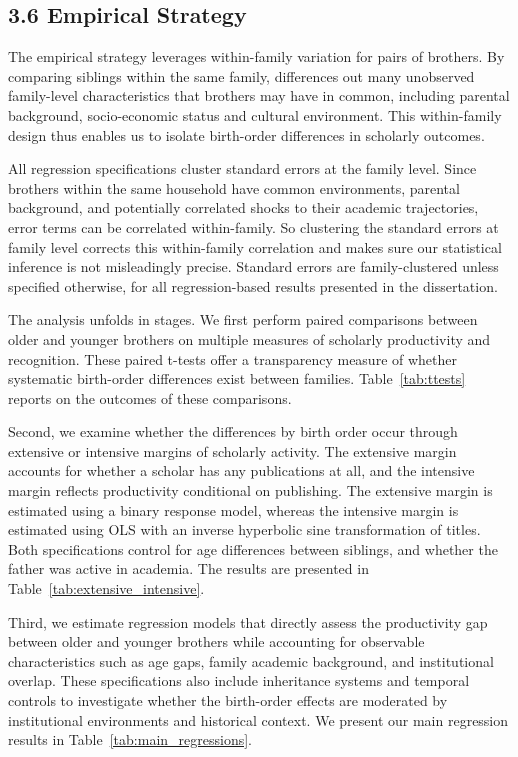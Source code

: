 \subsection*{3.6 Empirical Strategy}

The empirical strategy leverages within-family variation for pairs of brothers. By comparing siblings within the same family, differences out many unobserved family-level characteristics that brothers may have in common, including parental background, socio-economic status and cultural environment. This within-family design thus enables us to isolate birth-order differences in scholarly outcomes.

All regression specifications cluster standard errors at the family level. Since brothers within the same household have common environments, parental background, and potentially correlated shocks to their academic trajectories, error terms can be correlated within-family. So clustering the standard errors at family level corrects this within-family correlation and makes sure our statistical inference is not misleadingly precise. Standard errors are family-clustered unless specified otherwise, for all regression-based results presented in the dissertation.

The analysis unfolds in stages. We first perform paired comparisons between older and younger brothers on multiple measures of scholarly productivity and recognition. These paired t-tests offer a transparency measure of whether systematic birth-order differences exist between families. Table~\ref{tab:ttests} reports on the outcomes of these comparisons.

Second, we examine whether the differences by birth order occur through extensive or intensive margins of scholarly activity. The extensive margin accounts for whether a scholar has any publications at all, and the intensive margin reflects productivity conditional on publishing. The extensive margin is estimated using a binary response model, whereas the intensive margin is estimated using OLS with an inverse hyperbolic sine transformation of titles. Both specifications control for age differences between siblings, and whether the father was active in academia. The results are presented in Table~\ref{tab:extensive_intensive}.

Third, we estimate regression models that directly assess the productivity gap between older and younger brothers while accounting for observable characteristics such as age gaps, family academic background, and institutional overlap. These specifications also include inheritance systems and temporal controls to investigate whether the birth-order effects are moderated by institutional environments and historical context. We present our main regression results in Table~\ref{tab:main_regressions}.

